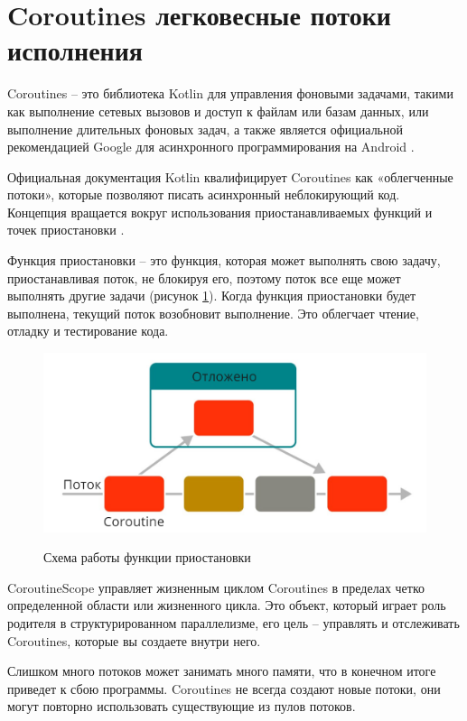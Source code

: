\section{Coroutines легковесные потоки исполнения}

Coroutines -- это библиотека Kotlin для управления фоновыми задачами, такими как выполнение сетевых вызовов и доступ к файлам или базам данных, или выполнение длительных фоновых задач, а также является официальной рекомендацией Google для асинхронного программирования на Android \cite{book:Jomar}.

Официальная документация Kotlin квалифицирует Coroutines как «облегченные потоки», которые позволяют писать асинхронный неблокирующий код. Концепция вращается вокруг использования приостанавливаемых функций и точек приостановки \cite{kotlin5}.

Функция приостановки -- это функция, которая может выполнять свою задачу, приостанавливая поток, не блокируя его, поэтому поток все еще может выполнять другие задачи (рисунок \ref{fig:coroutine}). Когда функция приостановки будет выполнена, текущий поток возобновит выполнение. Это облегчает чтение, отладку и тестирование кода.

\begin{figure}[h!]
    \begin{center}
        \includegraphics[width=0.95\hsize]{fig/coroutine.png}\\[2mm]
        \caption{Схема работы функции приостановки}\label{fig:coroutine}
    \end{center}
\end{figure}

CoroutineScope управляет жизненным циклом Coroutines в пределах четко определенной области или жизненного цикла. Это объект, который играет роль родителя в структурированном параллелизме, его цель -- управлять и отслеживать Coroutines, которые вы создаете внутри него.

Слишком много потоков может занимать много памяти, что в конечном итоге приведет к сбою программы. Coroutines не всегда создают новые потоки, они могут повторно использовать существующие из пулов потоков.

